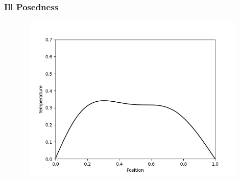 \documentclass{beamer}
\begin{document}
  




\begin{frame}
  \frametitle{Ill Posedness}
  \begin{figure}
    \centering
    \href{run:figs/reverse_heat_equation.mp4}{\includegraphics[width=12cm,height=8cm]{figs/reverse_heat_equation.png}}    
  \end{figure}
\end{frame}
\end{document}
